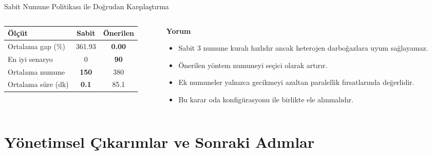 \documentclass[aspectratio=169,11pt]{beamer}
\begin{document}
\begin{frame}{Sabit Numune Politikası ile Doğrudan Karşılaştırma}
  \begin{columns}[T,totalwidth=\textwidth]
    \begin{column}{0.48\textwidth}
      \begin{table}
        \centering
        \small
        \begin{tabular}{lcc}
          \toprule
          \textbf{Ölçüt} & \textbf{Sabit} & \textbf{Önerilen} \\
          \midrule
          Ortalama gap (\%) & 361.93 & \textbf{0.00} \\
          En iyi senaryo & 0 & \textbf{90} \\
          Ortalama numune & \textbf{150} & 380 \\
          Ortalama süre (dk) & \textbf{0.1} & 85.1 \\
          \bottomrule
        \end{tabular}
      \end{table}
    \end{column}
    \begin{column}{0.49\textwidth}
      \textbf{Yorum}
      \begin{itemize}
        \item Sabit 3 numune kuralı hızlıdır ancak heterojen darboğazlara uyum sağlayamaz.
        \item Önerilen yöntem numuneyi seçici olarak artırır.
        \item Ek numuneler yalnızca gecikmeyi azaltan paralellik fırsatlarında değerlidir.
        \item Bu karar oda konfigürasyonu ile birlikte ele alınmalıdır.
      \end{itemize}
    \end{column}
  \end{columns}
\end{frame}

\section{Yönetimsel Çıkarımlar ve Sonraki Adımlar}
\end{document}
